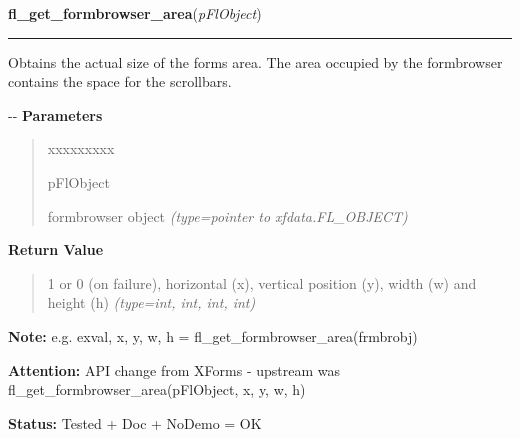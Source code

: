     \label{xformslib:flformbrowser:fl_get_formbrowser_area}

    \vspace{0.5ex}

\hspace{.8\funcindent}\begin{boxedminipage}{\funcwidth}

    \raggedright \textbf{fl\_get\_formbrowser\_area}(\textit{pFlObject})

    \vspace{-1.5ex}

    \rule{\textwidth}{0.5\fboxrule}
\setlength{\parskip}{2ex}

Obtains the actual size of the forms area. The area occupied by the
formbrowser contains the space for the scrollbars.

-{}-
\setlength{\parskip}{1ex}
      \textbf{Parameters}
      \vspace{-1ex}

      \begin{quote}
        \begin{Ventry}{xxxxxxxxx}

          \item[pFlObject]


formbrowser object
            {\it (type=pointer to xfdata.FL\_OBJECT)}

        \end{Ventry}

      \end{quote}

      \textbf{Return Value}
    \vspace{-1ex}

      \begin{quote}

1 or 0 (on failure), horizontal (x), vertical position (y),
width (w) and height (h)
      {\it (type=int, int, int, int)}

      \end{quote}

\textbf{Note:} 
e.g. exval, x, y, w, h = fl\_get\_formbrowser\_area(frmbrobj)


\textbf{Attention:} 
API change from XForms - upstream was
fl\_get\_formbrowser\_area(pFlObject, x, y, w, h)


\textbf{Status:} 
Tested + Doc + NoDemo = OK


    \end{boxedminipage}

